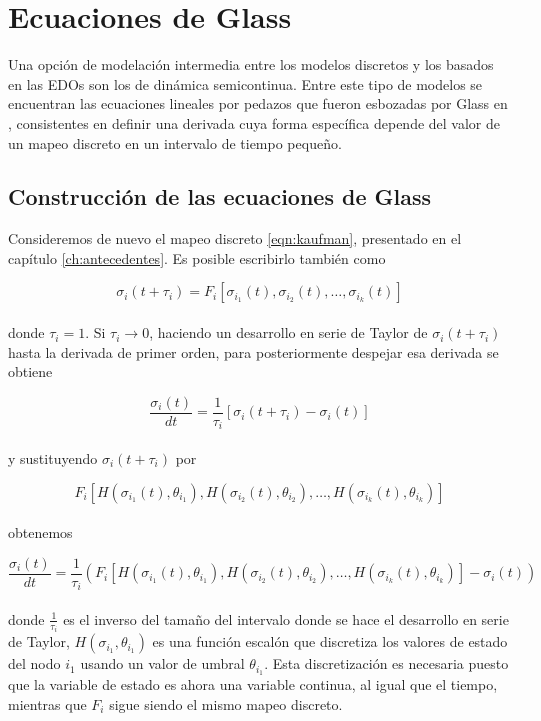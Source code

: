 \section{Ecuaciones de Glass}

Una opción de modelación intermedia entre los modelos discretos y los basados en las EDOs son los de dinámica semicontinua. Entre este tipo de modelos se encuentran las ecuaciones lineales por pedazos que fueron esbozadas por Glass en \citeauthor{Glass1973} \citep{Glass1973}, consistentes en definir una derivada cuya forma específica depende del valor de un mapeo discreto en un intervalo de tiempo pequeño. 

\subsection{Construcción de las ecuaciones de Glass}

Consideremos de nuevo el mapeo discreto \ref{eqn:kaufman}, presentado en el capítulo \ref{ch:antecedentes}.
Es posible escribirlo también como

\begin{equation}
\sigma_i(t+\tau_i)=F_i[\sigma_{i_1}(t),\sigma_{i_2}(t),\ldots,\sigma_{i_k}(t)]
\end{equation}
\\
donde $\tau_i=1$. Si $\tau_i \rightarrow 0$, haciendo un desarrollo en serie de Taylor de $\sigma_i(t+\tau_i)$ hasta la derivada de primer orden, para posteriormente despejar esa derivada se obtiene

\begin{equation}
\frac{\sigma_i(t)}{dt} = \frac{1}{\tau_i} [\sigma_i(t+\tau_i) - \sigma_i(t)]
\end{equation}
\\
y sustituyendo $\sigma_i(t+\tau_i)$ por 

\begin{equation}
F_i[H(\sigma_{i_1}(t), \theta_{i_1}), H(\sigma_{i_2}(t), \theta_{i_2}),\ldots, H(\sigma_{i_k}(t), \theta_{i_k})]
\end{equation}
\\
obtenemos 

\begin{equation}
\frac{\sigma_i(t)}{dt} = \frac{1}{\tau_i} (F_i[H(\sigma_{i_1}(t), \theta_{i_1}), H(\sigma_{i_2}(t), \theta_{i_2}),\ldots, H(\sigma_{i_k}(t), \theta_{i_k})] - \sigma_i(t))
\end{equation} 
\\
donde $\frac{1}{\tau_i}$ es el inverso del tamaño del intervalo donde se hace el desarrollo en serie de Taylor, $H(\sigma_{i_1}, \theta_{i_1})$ es una función escalón que discretiza los valores de estado del nodo $i_1$ usando un valor de umbral $\theta_{i_1}$. Esta discretización es necesaria puesto que la variable de estado es ahora una variable continua, al igual que el tiempo, mientras que $F_i$ sigue siendo el mismo mapeo discreto.

